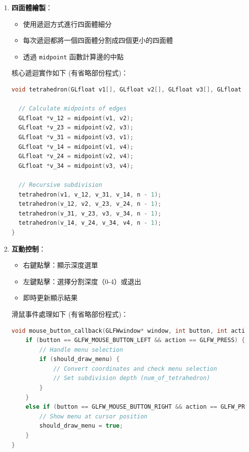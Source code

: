 \documentclass[12pt,a4paper]{article}
\begin{document}
\begin{enumerate}
  \item \textbf{四面體繪製}：
    \begin{itemize}
      \item 使用遞迴方式進行四面體細分
      \item 每次遞迴都將一個四面體分割成四個更小的四面體
      \item 透過 \texttt{midpoint} 函數計算邊的中點
    \end{itemize}
    
    核心遞迴實作如下 (有省略部份程式)：
    \newpage
    \begin{lstlisting}[language=C++,breaklines=true]
void tetrahedron(GLfloat v1[], GLfloat v2[], GLfloat v3[], GLfloat v4[], int n) {

  // Calculate midpoints of edges
  GLfloat *v_12 = midpoint(v1, v2);
  GLfloat *v_23 = midpoint(v2, v3);
  GLfloat *v_31 = midpoint(v3, v1);
  GLfloat *v_14 = midpoint(v1, v4);
  GLfloat *v_24 = midpoint(v2, v4);
  GLfloat *v_34 = midpoint(v3, v4);

  // Recursive subdivision
  tetrahedron(v1, v_12, v_31, v_14, n - 1);
  tetrahedron(v_12, v2, v_23, v_24, n - 1);
  tetrahedron(v_31, v_23, v3, v_34, n - 1);
  tetrahedron(v_14, v_24, v_34, v4, n - 1);
}
    \end{lstlisting}
    
  \item \textbf{互動控制}：
    \begin{itemize}
      \item 右鍵點擊：顯示深度選單
      \item 左鍵點擊：選擇分割深度（0-4）或退出
      \item 即時更新顯示結果
    \end{itemize}
    
    滑鼠事件處理如下 (有省略部份程式)：
    \newpage
    \begin{lstlisting}[language=C++,breaklines=true]
void mouse_button_callback(GLFWwindow* window, int button, int action, int mods) {
    if (button == GLFW_MOUSE_BUTTON_LEFT && action == GLFW_PRESS) {
        // Handle menu selection
        if (should_draw_menu) {
            // Convert coordinates and check menu selection
            // Set subdivision depth (num_of_tetrahedron)
        }
    }
    else if (button == GLFW_MOUSE_BUTTON_RIGHT && action == GLFW_PRESS) {
        // Show menu at cursor position
        should_draw_menu = true;
    }
}
    \end{lstlisting}


\end{enumerate}
\end{document}
